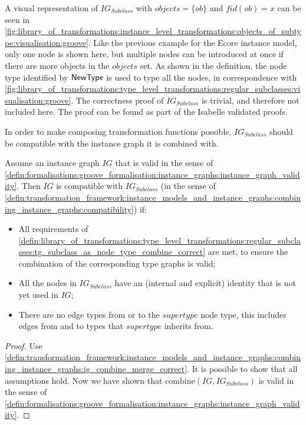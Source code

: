A visual representation of $IG_{Subclass}$ with $objects = \{ob\}$ and $fid(ob) = x$ can be seen in \cref{fig:library_of_transformations:instance_level_transformations:objects_of_subtype:visualisation:groove}. Like the previous example for the Ecore instance model, only one node is shown here, but multiple nodes can be introduced at once if there are more objects in the $objects$ set. As shown in the definition, the node type identified by $\mathsf{NewType}$ is used to type all the nodes, in correspondence with \cref{fig:library_of_transformations:type_level_transformations:regular_subclasses:visualisation:groove}. The correctness proof of $IG_{Subclass}$ is trivial, and therefore not included here. The proof can be found as part of the Isabelle validated proofs.

In order to make composing transformation functions possible, $IG_{Subclass}$ should be compatible with the instance graph it is combined with.

\begin{thm}
\label{defin:library_of_transformations:instance_level_transformations:objects_of_subtype:ig_subclass_as_node_type_combine_correct}
Assume an instance graph $IG$ that is valid in the sense of \cref{defin:formalisations:groove_formalisation:instance_graphs:instance_graph_validity}. Then $IG$ is compatible with $IG_{Subclass}$ (in the sense of \cref{defin:transformation_framework:instance_models_and_instance_graphs:combining_instance_graphs:compatibility}) if:
\begin{itemize}
    \item All requirements of \cref{defin:library_of_transformations:type_level_transformations:regular_subclasses:tg_subclass_as_node_type_combine_correct} are met, to ensure the combination of the corresponding type graphs is valid;
    \item All the nodes in $IG_{Subclass}$ have an (internal and explicit) identity that is not yet used in $IG$;
    \item There are no edge types from or to the $supertype$ node type, this includes edges from and to types that $supertype$ inherits from.
\end{itemize}
\end{thm}

\begin{proof}
Use \cref{defin:transformation_framework:instance_models_and_instance_graphs:combining_instance_graphs:ig_combine_merge_correct}. It is possible to show that all assumptions hold. Now we have shown that $\mathrm{combine}(IG, IG_{Subclass})$ is valid in the sense of \cref{defin:formalisations:groove_formalisation:instance_graphs:instance_graph_validity}.
\end{proof}

